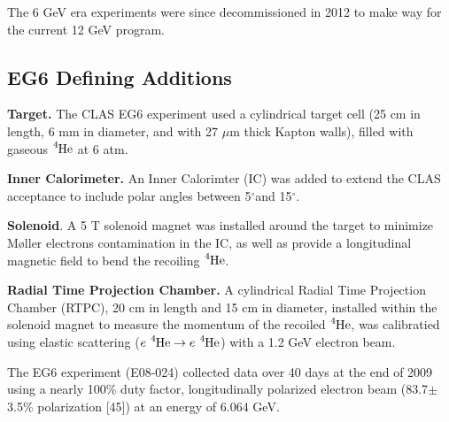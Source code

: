 \documentclass[10pt,prd,aps,showpacs,twocolumn,unsortedaddress]{revtex4-1}
\newcommand\he{{\ce{^{4}He}}}
\renewcommand{\deg}{\ensuremath{^\circ}}
\renewcommand\b[1]{{\textbf{#1}}}
\newcommand\moller{{M{\o}ller} }
\newcommand\elastic{e ~\he \rightarrow e ~\he  }
\begin{document}
The 6 GeV era experiments were since decommissioned in 2012 to make way for the current 12 GeV program. 


\subsection{EG6 Defining Additions}
\b{Target.}
The CLAS EG6 experiment used a cylindrical target cell  
(25 cm in length, 6 mm in diameter, and with 27 $\mu$m thick Kapton walls),
filled with gaseous $\he$ at 6 atm.

\b{Inner Calorimeter.}
An Inner Calorimter (IC) was added to extend the CLAS acceptance to include polar angles between 5\deg and 15\deg.

\b{Solenoid}.
A 5 T solenoid magnet was installed around the target to minimize
\moller electrons contamination in the IC, as well as provide a longitudinal magnetic field to bend the recoiling $\he$. 

\b{Radial Time Projection Chamber.}
A cylindrical Radial Time Projection Chamber (RTPC), 20 cm in length and 15 cm in diameter, installed within the solenoid magnet 
to measure the momentum of the recoiled $\he$, was calibratied using elastic scattering ($\elastic$) with a 1.2 GeV electron beam.


The EG6 experiment (E08-024) 
collected data over 40 days at the end of 2009 using a nearly 100\% duty factor, 
longitudinally polarized electron beam (83.7$\pm$3.5\% polarization [45]) at an energy of 6.064 GeV. 
\end{document}
